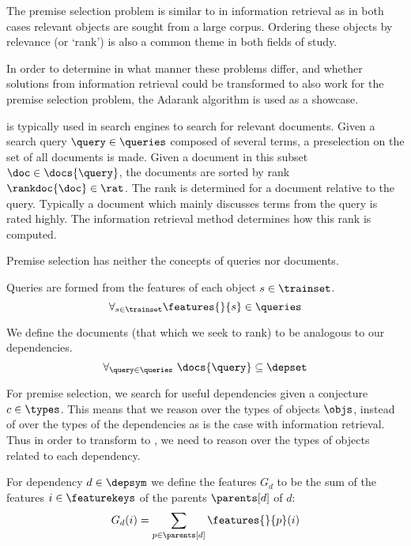 The premise selection problem is similar to \ltr in information retrieval
as in both cases relevant objects are sought from a large corpus.
Ordering these objects by relevance (or `rank') is also a common theme in both fields of study.

In order to determine in what manner these problems differ, and whether solutions
from information retrieval could be transformed to also work for the premise selection problem,
the Adarank algorithm \cite{xu2007adarank} is used as a showcase.

\ltr is typically used in search engines to search for relevant documents.
Given a search query $\query \in \queries$ composed of several terms, a preselection on the set of
all documents is made. Given a document in this subset $\doc \in \docs{\query}$,
the documents are sorted by rank $\rankdoc{\doc} \in \rat$.
The rank is determined for a document relative to the query.
Typically a document which mainly discusses terms from the query is rated highly.
The information retrieval method determines how this rank is computed.

Premise selection has neither the concepts of queries nor documents.

\begin{definition}
  Queries are formed from the features of each object $s \in \trainset$.
  \[
    \forall_{s \in \trainset} \features{}{s} \in \queries
  \]
\end{definition}

\begin{definition}
  We define the documents (that which we seek to rank) to be analogous to our dependencies.
  \[
    \forall_{\query \in \queries}~ \docs{\query} \subseteq \depset
  \]
\end{definition}

For premise selection, we search for useful dependencies given a conjecture $c \in \types$.
This means that we reason over the types of objects $\objs$,
instead of over the types of the dependencies as is the case with information retrieval.
Thus in order to transform to \ltr, we need to reason over the types of objects related to each dependency.

\begin{definition}
  For dependency $d \in \depsym$ we define the features $G_d$ to be the sum of
  the features $i \in \featurekeys$ of the parents $\parents[d]$ of $d$:
  \[
    G_d(i) = \sum_{p \in \parents[d]} \features{}{p}(i)
  \]
\end{definition}

